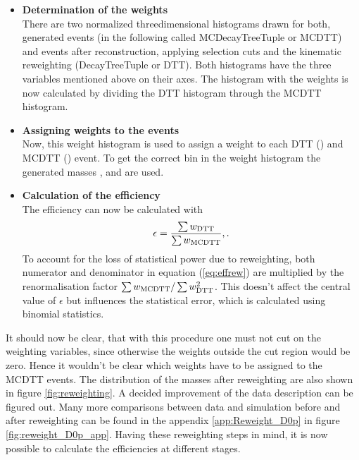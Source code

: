 \begin{itemize}
    \item \textbf{Determination of the weights} \\
          There are two normalized threedimensional histograms drawn for both, generated events (in the following called MCDecayTreeTuple or MCDTT) and events after reconstruction, applying selection cuts and the kinematic reweighting (DecayTreeTuple or DTT). 
          Both histograms have the three variables mentioned above on their axes.
          The histogram with the weights is now calculated by dividing the DTT histogram through the MCDTT histogram.
    \item \textbf{Assigning weights to the events} \\
          Now, this weight histogram is used to assign a weight to each DTT () and MCDTT () event.
          To get the correct bin in the weight histogram the generated masses \Mtrue{\Dz\proton}, \Mtrue{\Dz\mun} and \Mtrue{\Dz\proton\mun} are used.
    \item \textbf{Calculation of the efficiency} \\
          The efficiency can now be calculated with
          \begin{align}
              \epsilon = \frac{\sum w_{\text{DTT}}}{\sum w_{\text{MCDTT}}}, \label{eq:effrew}.
          \end{align}
          To account for the loss of statistical power due to reweighting, both numerator and denominator in equation (\ref{eq:effrew}) are multiplied by the renormalisation factor $\sum w_{\text{MCDTT}} / \sum w_{\text{DTT}}^2$. 
          This doesn't affect the central value of $\epsilon$ but influences the statistical error, which is calculated using binomial statistics.
\end{itemize}
It should now be clear, that with this procedure one must not cut on the weighting variables, since otherwise the weights outside the cut region would be zero. 
Hence it wouldn't be clear which weights have to be assigned to the MCDTT events. 
The distribution of the masses after reweighting are also shown in figure \ref{fig:reweighting}.
A decided improvement of the data description can be figured out.
Many more comparisons between data and simulation before and after reweighting can be found in the appendix \ref{app:Reweight_D0p} in figure \ref{fig:reweight_D0p_app}.
Having these reweighting steps in mind, it is now possible to calculate the efficiencies at different stages.


